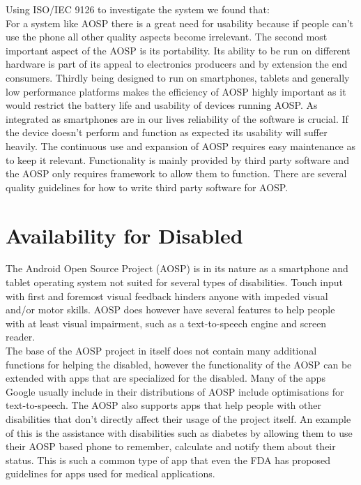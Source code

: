 \documentclass[conference]{IEEEtran}
\begin{document}
Using ISO/IEC 9126\cite{jung2004} to investigate the system we found that: \\
For a system like AOSP there is a great need for usability because if people can't use the phone all other quality aspects become irrelevant. The second most important aspect of the AOSP is its portability. Its ability to be run on different hardware is part of its appeal to electronics producers and by extension the end consumers. Thirdly being designed to run on smartphones, tablets and generally low performance platforms makes the efficiency of AOSP highly important as it would restrict the battery life and usability of devices running AOSP. As integrated as smartphones are in our lives reliability of the software is crucial. If the device doesn't perform and function as expected its usability will suffer heavily. The continuous use and expansion of AOSP requires easy maintenance as to keep it relevant. Functionality is mainly provided by third party software and the AOSP only requires framework to allow them to function. There are several quality guidelines for how to write third party software for AOSP.\cite{android-quality}


\section{Availability for Disabled}
\label{availability}


The Android Open Source Project (AOSP) is in its nature as a smartphone and tablet operating system not suited for several types of disabilities. Touch input with first and foremost visual feedback hinders anyone with impeded visual and/or motor skills. AOSP does however have several features to help people with at least visual impairment, such as a text-to-speech engine and screen reader.\cite{android-disabled-help} \\The base of the AOSP project in itself does not contain many additional functions for helping the disabled, however the functionality of the AOSP can be extended with apps that are specialized for the disabled.\cite{android-disabled-apps} Many of the apps Google usually include in their distributions of AOSP include optimisations for text-to-speech.\cite{android-disabled-help} The AOSP also supports apps that help people with other disabilities that don't directly affect their usage of the project itself. An example of this is the assistance with disabilities such as diabetes by allowing them to use their AOSP based phone to remember, calculate and notify them about their status.\cite{android-disabled-diabetes} This is such a common type of app that even the FDA has proposed guidelines for apps used for medical applications.\cite{android-disabled-FDA}
\end{document}
